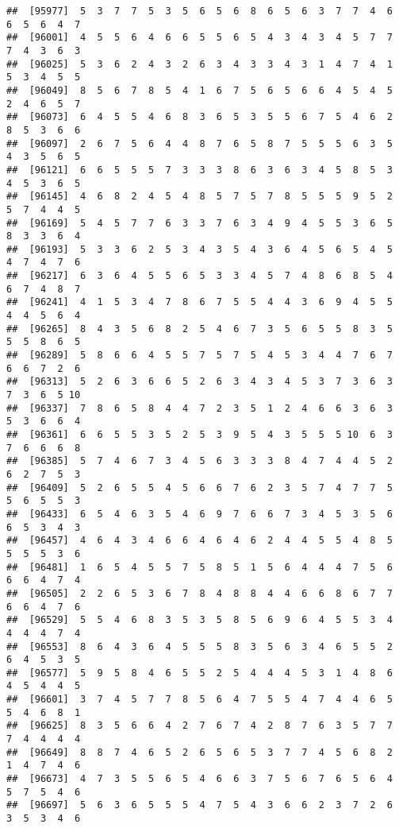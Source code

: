 \documentclass[
]{book}
\begin{document}
\begin{verbatim}
##  [95977]  5  3  7  7  5  3  5  6  5  6  8  6  5  6  3  7  7  4  6  6  5  6  4  7
##  [96001]  4  5  5  6  4  6  6  5  5  6  5  4  3  4  3  4  5  7  7  7  4  3  6  3
##  [96025]  5  3  6  2  4  3  2  6  3  4  3  3  4  3  1  4  7  4  1  5  3  4  5  5
##  [96049]  8  5  6  7  8  5  4  1  6  7  5  6  5  6  6  4  5  4  5  2  4  6  5  7
##  [96073]  6  4  5  5  4  6  8  3  6  5  3  5  5  6  7  5  4  6  2  8  5  3  6  6
##  [96097]  2  6  7  5  6  4  4  8  7  6  5  8  7  5  5  5  6  3  5  4  3  5  6  5
##  [96121]  6  6  5  5  5  7  3  3  3  8  6  3  6  3  4  5  8  5  3  4  5  3  6  5
##  [96145]  4  6  8  2  4  5  4  8  5  7  5  7  8  5  5  5  9  5  2  5  7  4  4  5
##  [96169]  5  4  5  7  7  6  3  3  7  6  3  4  9  4  5  5  3  6  5  8  3  3  6  4
##  [96193]  5  3  3  6  2  5  3  4  3  5  4  3  6  4  5  6  5  4  5  4  7  4  7  6
##  [96217]  6  3  6  4  5  5  6  5  3  3  4  5  7  4  8  6  8  5  4  6  7  4  8  7
##  [96241]  4  1  5  3  4  7  8  6  7  5  5  4  4  3  6  9  4  5  5  4  4  5  6  4
##  [96265]  8  4  3  5  6  8  2  5  4  6  7  3  5  6  5  5  8  3  5  5  5  8  6  5
##  [96289]  5  8  6  6  4  5  5  7  5  7  5  4  5  3  4  4  7  6  7  6  6  7  2  6
##  [96313]  5  2  6  3  6  6  5  2  6  3  4  3  4  5  3  7  3  6  3  7  3  6  5 10
##  [96337]  7  8  6  5  8  4  4  7  2  3  5  1  2  4  6  6  3  6  3  5  3  6  6  4
##  [96361]  6  6  5  5  3  5  2  5  3  9  5  4  3  5  5  5 10  6  3  7  6  6  6  8
##  [96385]  5  7  4  6  7  3  4  5  6  3  3  3  8  4  7  4  4  5  2  6  2  7  5  3
##  [96409]  5  2  6  5  5  4  5  6  6  7  6  2  3  5  7  4  7  7  5  5  6  5  5  3
##  [96433]  6  5  4  6  3  5  4  6  9  7  6  6  7  3  4  5  3  5  6  6  5  3  4  3
##  [96457]  4  6  4  3  4  6  6  4  6  4  6  2  4  4  5  5  4  8  5  5  5  5  3  6
##  [96481]  1  6  5  4  5  5  7  5  8  5  1  5  6  4  4  4  7  5  6  6  6  4  7  4
##  [96505]  2  2  6  5  3  6  7  8  4  8  8  4  4  6  6  8  6  7  7  6  6  4  7  6
##  [96529]  5  5  4  6  8  3  5  3  5  8  5  6  9  6  4  5  5  3  4  4  4  4  7  4
##  [96553]  8  6  4  3  6  4  5  5  5  8  3  5  6  3  4  6  5  5  2  6  4  5  3  5
##  [96577]  5  9  5  8  4  6  5  5  2  5  4  4  4  5  3  1  4  8  6  4  5  4  4  5
##  [96601]  3  7  4  5  7  7  8  5  6  4  7  5  5  4  7  4  4  6  5  5  4  6  8  1
##  [96625]  8  3  5  6  6  4  2  7  6  7  4  2  8  7  6  3  5  7  7  7  4  4  4  4
##  [96649]  8  8  7  4  6  5  2  6  5  6  5  3  7  7  4  5  6  8  2  1  4  7  4  6
##  [96673]  4  7  3  5  5  6  5  4  6  6  3  7  5  6  7  6  5  6  4  5  7  5  4  6
##  [96697]  5  6  3  6  5  5  5  4  7  5  4  3  6  6  2  3  7  2  6  3  5  3  4  6

\end{verbatim}
\end{document}
